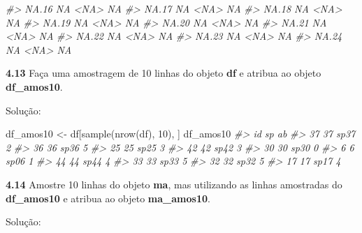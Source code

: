 \documentclass[
]{book}
\newenvironment{Shaded}{\begin{snugshade}}{\end{snugshade}}
\newcommand{\CommentTok}[1]{\textcolor[rgb]{0.56,0.35,0.01}{\textit{#1}}}
\newcommand{\DecValTok}[1]{\textcolor[rgb]{0.00,0.00,0.81}{#1}}
\newcommand{\FunctionTok}[1]{\textcolor[rgb]{0.00,0.00,0.00}{#1}}
\newcommand{\NormalTok}[1]{#1}
\newcommand{\OtherTok}[1]{\textcolor[rgb]{0.56,0.35,0.01}{#1}}
\begin{document}
\begin{Shaded}
\begin{Highlighting}[]
\CommentTok{\#\textgreater{} NA.16 NA \textless{}NA\textgreater{} NA}
\CommentTok{\#\textgreater{} NA.17 NA \textless{}NA\textgreater{} NA}
\CommentTok{\#\textgreater{} NA.18 NA \textless{}NA\textgreater{} NA}
\CommentTok{\#\textgreater{} NA.19 NA \textless{}NA\textgreater{} NA}
\CommentTok{\#\textgreater{} NA.20 NA \textless{}NA\textgreater{} NA}
\CommentTok{\#\textgreater{} NA.21 NA \textless{}NA\textgreater{} NA}
\CommentTok{\#\textgreater{} NA.22 NA \textless{}NA\textgreater{} NA}
\CommentTok{\#\textgreater{} NA.23 NA \textless{}NA\textgreater{} NA}
\CommentTok{\#\textgreater{} NA.24 NA \textless{}NA\textgreater{} NA}
\end{Highlighting}
\end{Shaded}

\textbf{4.13}
Faça uma amostragem de 10 linhas do objeto \textbf{df} e atribua ao objeto \textbf{df\_amos10}.

Solução:

\begin{Shaded}
\begin{Highlighting}[]
\NormalTok{df\_amos10 }\OtherTok{\textless{}{-}}\NormalTok{ df[}\FunctionTok{sample}\NormalTok{(}\FunctionTok{nrow}\NormalTok{(df), }\DecValTok{10}\NormalTok{), ]}
\NormalTok{df\_amos10}
\CommentTok{\#\textgreater{}    id   sp ab}
\CommentTok{\#\textgreater{} 37 37 sp37  2}
\CommentTok{\#\textgreater{} 36 36 sp36  5}
\CommentTok{\#\textgreater{} 25 25 sp25  3}
\CommentTok{\#\textgreater{} 42 42 sp42  3}
\CommentTok{\#\textgreater{} 30 30 sp30  0}
\CommentTok{\#\textgreater{} 6   6 sp06  1}
\CommentTok{\#\textgreater{} 44 44 sp44  4}
\CommentTok{\#\textgreater{} 33 33 sp33  5}
\CommentTok{\#\textgreater{} 32 32 sp32  5}
\CommentTok{\#\textgreater{} 17 17 sp17  4}
\end{Highlighting}
\end{Shaded}

\textbf{4.14}
Amostre 10 linhas do objeto \textbf{ma}, mas utilizando as linhas amostradas do \textbf{df\_amos10} e atribua ao objeto \textbf{ma\_amos10}.

Solução:
\end{document}
